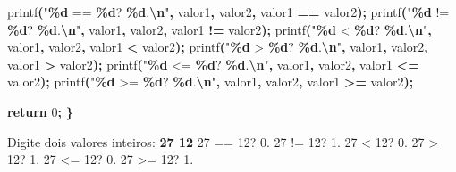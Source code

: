 \documentclass[
  11pt,
  a4paper,
]{scrbook}
\newenvironment{Shaded}{\begin{snugshade}}{\end{snugshade}}
\newcommand{\ControlFlowTok}[1]{\textcolor[rgb]{0.13,0.29,0.53}{\textbf{#1}}}
\newcommand{\DecValTok}[1]{\textcolor[rgb]{0.00,0.00,0.81}{#1}}
\newcommand{\KeywordTok}[1]{\textcolor[rgb]{0.13,0.29,0.53}{\textbf{#1}}}
\newcommand{\NormalTok}[1]{#1}
\newcommand{\OperatorTok}[1]{\textcolor[rgb]{0.81,0.36,0.00}{\textbf{#1}}}
\newcommand{\SpecialCharTok}[1]{\textcolor[rgb]{0.81,0.36,0.00}{\textbf{#1}}}
\newcommand{\StringTok}[1]{\textcolor[rgb]{0.31,0.60,0.02}{#1}}
\begin{document}
\begin{Shaded}
\begin{Highlighting}[]
\NormalTok{    printf}\OperatorTok{(}\StringTok{"}\SpecialCharTok{\%d}\StringTok{ == }\SpecialCharTok{\%d}\StringTok{? }\SpecialCharTok{\%d}\StringTok{.}\SpecialCharTok{\textbackslash{}n}\StringTok{"}\OperatorTok{,}\NormalTok{ valor1}\OperatorTok{,}\NormalTok{ valor2}\OperatorTok{,}\NormalTok{ valor1 }\OperatorTok{==}\NormalTok{ valor2}\OperatorTok{);}
\NormalTok{    printf}\OperatorTok{(}\StringTok{"}\SpecialCharTok{\%d}\StringTok{ != }\SpecialCharTok{\%d}\StringTok{? }\SpecialCharTok{\%d}\StringTok{.}\SpecialCharTok{\textbackslash{}n}\StringTok{"}\OperatorTok{,}\NormalTok{ valor1}\OperatorTok{,}\NormalTok{ valor2}\OperatorTok{,}\NormalTok{ valor1 }\OperatorTok{!=}\NormalTok{ valor2}\OperatorTok{);}
\NormalTok{    printf}\OperatorTok{(}\StringTok{"}\SpecialCharTok{\%d}\StringTok{ \textless{} }\SpecialCharTok{\%d}\StringTok{?  }\SpecialCharTok{\%d}\StringTok{.}\SpecialCharTok{\textbackslash{}n}\StringTok{"}\OperatorTok{,}\NormalTok{ valor1}\OperatorTok{,}\NormalTok{ valor2}\OperatorTok{,}\NormalTok{ valor1 }\OperatorTok{\textless{}}\NormalTok{ valor2}\OperatorTok{);}
\NormalTok{    printf}\OperatorTok{(}\StringTok{"}\SpecialCharTok{\%d}\StringTok{ \textgreater{} }\SpecialCharTok{\%d}\StringTok{?  }\SpecialCharTok{\%d}\StringTok{.}\SpecialCharTok{\textbackslash{}n}\StringTok{"}\OperatorTok{,}\NormalTok{ valor1}\OperatorTok{,}\NormalTok{ valor2}\OperatorTok{,}\NormalTok{ valor1 }\OperatorTok{\textgreater{}}\NormalTok{ valor2}\OperatorTok{);}
\NormalTok{    printf}\OperatorTok{(}\StringTok{"}\SpecialCharTok{\%d}\StringTok{ \textless{}= }\SpecialCharTok{\%d}\StringTok{? }\SpecialCharTok{\%d}\StringTok{.}\SpecialCharTok{\textbackslash{}n}\StringTok{"}\OperatorTok{,}\NormalTok{ valor1}\OperatorTok{,}\NormalTok{ valor2}\OperatorTok{,}\NormalTok{ valor1 }\OperatorTok{\textless{}=}\NormalTok{ valor2}\OperatorTok{);}
\NormalTok{    printf}\OperatorTok{(}\StringTok{"}\SpecialCharTok{\%d}\StringTok{ \textgreater{}= }\SpecialCharTok{\%d}\StringTok{? }\SpecialCharTok{\%d}\StringTok{.}\SpecialCharTok{\textbackslash{}n}\StringTok{"}\OperatorTok{,}\NormalTok{ valor1}\OperatorTok{,}\NormalTok{ valor2}\OperatorTok{,}\NormalTok{ valor1 }\OperatorTok{\textgreater{}=}\NormalTok{ valor2}\OperatorTok{);}

    \ControlFlowTok{return} \DecValTok{0}\OperatorTok{;}
\OperatorTok{\}}
\end{Highlighting}
\end{Shaded}

\begin{Shaded}
\begin{Highlighting}[]
\NormalTok{Digite dois valores inteiros: }\KeywordTok{ 27 12 }
\NormalTok{27 == 12? 0.}
\NormalTok{27 != 12? 1.}
\NormalTok{27 \textless{} 12?  0.}
\NormalTok{27 \textgreater{} 12?  1.}
\NormalTok{27 \textless{}= 12? 0.}
\NormalTok{27 \textgreater{}= 12? 1.}
\end{Highlighting}
\end{Shaded}
\end{document}
